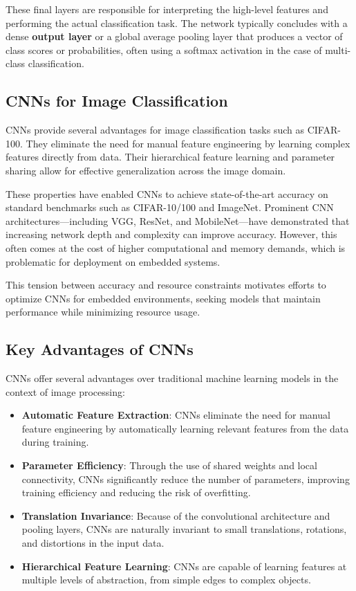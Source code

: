 These final layers are responsible for interpreting the high-level features and performing the actual classification task. The network typically concludes with a dense \textbf{output layer }or a global average pooling layer that produces a vector of class scores or probabilities, often using a softmax activation in the case of multi-class classification.


\subsection{CNNs for Image Classification}

CNNs provide several advantages for image classification tasks such as CIFAR-100. They eliminate the need for manual feature engineering by learning complex features directly from data. Their hierarchical feature learning and parameter sharing allow for effective generalization across the image domain.

These properties have enabled CNNs to achieve state-of-the-art accuracy on standard benchmarks such as CIFAR-10/100 and ImageNet. Prominent CNN architectures---including VGG, ResNet, and MobileNet---have demonstrated that increasing network depth and complexity can improve accuracy. However, this often comes at the cost of higher computational and memory demands, which is problematic for deployment on embedded systems.

This tension between accuracy and resource constraints motivates efforts to optimize CNNs for embedded environments, seeking models that maintain performance while minimizing resource usage.

\subsection{Key Advantages of CNNs}
CNNs offer several advantages over traditional machine learning models in the context of image processing:
\begin{itemize}
    \item \textbf{Automatic Feature Extraction}: CNNs eliminate the need for manual feature engineering by automatically learning relevant features from the data during training.
    \item \textbf{Parameter Efficiency}: Through the use of shared weights and local connectivity, CNNs significantly reduce the number of parameters, improving training efficiency and reducing the risk of overfitting.
    \item \textbf{Translation Invariance}: Because of the convolutional architecture and pooling layers, CNNs are naturally invariant to small translations, rotations, and distortions in the input data.
    \item \textbf{Hierarchical Feature Learning}: CNNs are capable of learning features at multiple levels of abstraction, from simple edges to complex objects.

\end{itemize}

